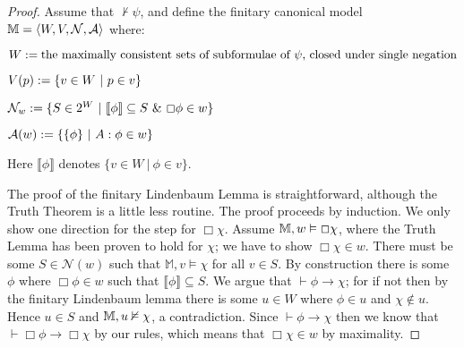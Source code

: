 \begin{proof}
  Assume that $\nvdash \psi$, and define the finitary canonical model
  $\mathbbm{M}= \langle W, V, \mathcal{N}, \mathcal{A} \rangle$
  where:
  \begin{itemizedot}
    \item $W \assign \text{the maximally consistent sets of subformulae of
    $\psi$, closed under single negation}$
    \item $V (p) \assign \{v \in W \  | \  p \in v\}$
    \item $\mathcal{N}_w \assign \{S \in 2^W \  | \  \llbracket \phi
  \rrbracket \subseteq S \  \&
    \  \Box \phi \in w\}$
    \item $\mathcal{A}(w) \assign \{\{\phi\} \  | \  A :
    \phi \in w\}$
  \end{itemizedot}
  Here $\llbracket \phi \rrbracket$ denotes $\{ v \in W\ |\ \phi
\in v\}$.
  
  The proof of the finitary Lindenbaum Lemma is straightforward,
  although the Truth Theorem is a little less routine. The proof
  proceeds by induction.  
  We only show one direction for the step for $\Box \chi$.
  Assume $\mathbbm{M}, w \vDash \Box \chi$, where the Truth Lemma has been proven to
  hold for $\chi$; we have to show $\Box \chi \in w$.  There must be some
  $S \in \mathcal{N}(w)$ such that $\mathbb{M},v \models \chi$ for all
  $v \in S$. By construction there is some $\phi$ where $\Box \phi \in
  w$ such that $\llbracket \phi \rrbracket \subseteq S$.  We argue that $\vdash \phi
  \rightarrow \chi$; for if not then by the finitary Lindenbaum lemma there is
  some $u \in W$ where $\phi \in u$ and $\chi \nin u$.  Hence $u \in S$ and
  $\mathbbm{M}, u \nvDash \chi$, a contradiction.  Since $\vdash \phi
  \rightarrow \chi$ then we know that $\vdash \Box \phi \rightarrow \Box \chi$
  by our rules, which means that $\Box \chi \in w$ by maximality.
  

\end{proof}
